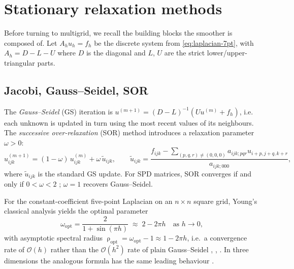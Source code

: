 \documentclass[11pt]{article}
\theoremstyle{definition}
\newcommand{\bigO}{\mathcal{O}}
\DeclareMathOperator{\spr}{\rho}
\begin{document}
\section{Stationary relaxation methods}\label{sec:relaxation}

Before turning to multigrid, we recall the building blocks the smoother
is composed of.  Let $A_h u_h = f_h$ be the discrete system from
\eqref{eq:laplacian-7pt}, with $A_h = D - L - U$ where $D$ is the diagonal
and $L$, $U$ are the strict lower/upper-triangular parts.

\subsection{Jacobi, Gauss--Seidel, SOR}
The \emph{Gauss--Seidel} (GS) iteration is
$u^{(m+1)} = (D-L)^{-1}(U u^{(m)} + f_h)$, i.e. each unknown is updated
in turn using the most recent values of its neighbours.  The
\emph{successive over-relaxation} (SOR) method introduces a relaxation
parameter $\omega>0$:
\begin{equation}\label{eq:sor}
  u^{(m+1)}_{ijk}
  = (1-\omega)\,u^{(m)}_{ijk} + \omega\,\widetilde u_{ijk},\qquad
  \widetilde u_{ijk} = \frac{f_{ijk} - \sum_{(p,q,r)\ne(0,0,0)} a_{ijk;pqr}
  u_{i+p,j+q,k+r}}{a_{ijk;000}},
\end{equation}
where $\widetilde u_{ijk}$ is the standard GS update.  For SPD matrices,
SOR converges if and only if $0<\omega<2$ \cite[Thm.~10.1.2]{golub2013matrix};
$\omega=1$ recovers Gauss--Seidel.

For the constant-coefficient five-point Laplacian on an $n\times n$
square grid, Young's classical analysis yields the optimal parameter
\begin{equation}\label{eq:omega-opt}
  \omega_{\mathrm{opt}} = \frac{2}{1 + \sin(\pi h)} \;\approx\; 2 - 2\pi h
  \quad \text{as } h\to 0,
\end{equation}
with asymptotic spectral radius $\spr_{\mathrm{opt}} = \omega_{\mathrm{opt}}
- 1 \approx 1 - 2\pi h$, i.e.\ a convergence rate of $\bigO(h)$ rather than
the $\bigO(h^2)$ rate of plain Gauss--Seidel
\cite[Ch.~5]{young1971iterative},
\cite[\S4.2.2]{saad2003iterative},
\cite[Ch.~3]{varga2009matrix}.  In three dimensions the analogous
formula has the same leading behaviour
\cite[\S2.5]{trottenberg2001multigrid}.
\end{document}
